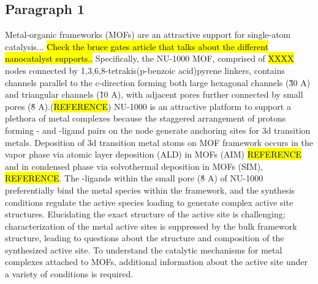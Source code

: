 \documentclass[journal=jctcce,manuscript=article]{achemso}
\begin{document}
\subsection{Paragraph 1}
Metal-organic frameworks (MOFs) are an attractive support for single-atom catalysis... \hl{Check the bruce gates article that talks about the different nanocatalyst supports.. }
Specifically, the NU-1000 MOF, comprised of \hl{XXXX} nodes connected by 1,3,6,8-tetrakis(p-benzoic acid)pyrene linkers, contains channels parallel to the c-direction forming both large hexagonal channels (\~30 A) and triangular channels (\~10 A), with adjacent pores further connected by small pores (\~8 A).(\hl{REFERENCE}) NU-1000 is an attractive platform to support a plethora of metal complexes because the staggered arrangement of protons forming - and -ligand pairs on the node generate anchoring sites for 3d transition metals.\cite{Planas2014} Deposition of 3d transition metal atoms on MOF framework occurs in the vapor phase via atomic layer deposition (ALD) in MOFs (AIM) \hl{REFERENCE} and in condensed phase via solvothermal deposition in MOFs (SIM), \hl{REFERENCE}. The -ligands within the small pore (\~8 A) of NU-1000 preferentially bind the metal species within the framework,\cite{Gallington2016} and the synthesis conditions regulate the active species loading to generate complex active site structures.\cite{Kim2015} Elucidating the exact structure of the active site is challenging; characterization of the metal active sites is suppressed by the bulk framework structure, leading to questions about the structure and composition of the synthesized active site. To understand the catalytic mechanisms for metal complexes attached to MOFs, additional information about the active site under a variety of conditions is required. 

\end{document}
